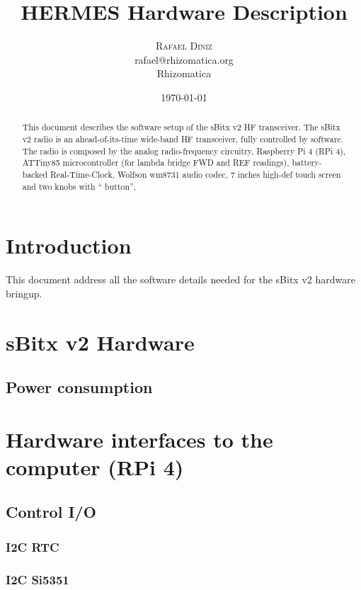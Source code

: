 \documentclass[11pt,a4paper]{article}
\title{HERMES Hardware Description}
\author{
       \large
        \textsc{Rafael Diniz}
        \mbox{}\\ %
        rafael@rhizomatica.org\\
        \mbox{Rhizomatica} \\ %
}
\date{\today}
\begin{document}
\maketitle

\begin{abstract}
  This document describes the software setup of the sBitx v2 HF transceiver.
  The sBitx v2 radio is an ahead-of-its-time wide-band HF transceiver, fully
  controlled by software. The radio is composed by the analog radio-frequency circuitry,
  Raspberry Pi 4 (RPi 4), ATTiny85 microcontroller (for lambda bridge FWD and REF readings), battery-backed
  Real-Time-Clock, Wolfson wm8731 audio codec, 7 inches high-def touch screen and two knobs with `` button'',
\end{abstract}

\newpage

\tableofcontents

\section{Introduction}

This document address all the software details needed for the sBitx v2 hardware bringup.



\section{sBitx v2 Hardware}


\subsection{Power consumption}


\section{Hardware interfaces to the computer (RPi 4)}


\subsection {Control I/O}

\subsubsection{I2C RTC}

\subsubsection{I2C Si5351}
\end{document}
